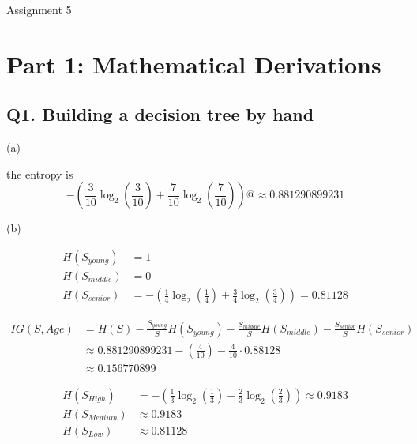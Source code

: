 \documentclass{report}
\begin{document}
\thispagestyle{empty}
\begin{center} \LARGE Assignment 5 \end{center}

\section*{Part 1: Mathematical Derivations}

\subsection*{Q1. Building a decision tree by hand}
(a)

the entropy is \begin{equation}
    -\left( \frac{3}{10} \log_2(\frac{3}{10}) + \frac{7}{10} \log_2(\frac{7}{10}) \right)@ \approx 0.881290899231
\end{equation}

(b)



\begin{equation}\begin{split}
        H(S_{young}) &= 1\\
        H(S_{middle}) &= 0\\
        H(S_{senior}) &= -\left( \frac{1}{4} \log_2(\frac{1}{4}  ) + \frac{3}{4} \log_2(\frac{3}{4})  \right)=  0.81128
\end{split}
\end{equation}

\begin{equation}\begin{split}
        IG(S,Age) &= H(S) - \frac{S_{young}}{S} H(S_{young}) - \frac{S_{middle}}{S} H(S_{middle}) - \frac{S_{senior}}{S} H(S_{senior}) \\
        &\approx 0.881290899231 - (\frac{4}{10}   ) - \frac{4}{10} \cdot 0.88128\\
        &\approx 0.156770899
\end{split}
\end{equation}


\begin{equation}\begin{split}
    H(S_{High}) &= -\left(\frac{1}{3}\log_2(\frac{1}{3}) + \frac{2}{3}\log_2(\frac{2}{3})\right) \approx 0.9183\\
    H(S_{Medium}) &\approx 0.9183\\
    H(S_{Low}) &\approx 0.81128
\end{split}
\end{equation}
\end{document}
